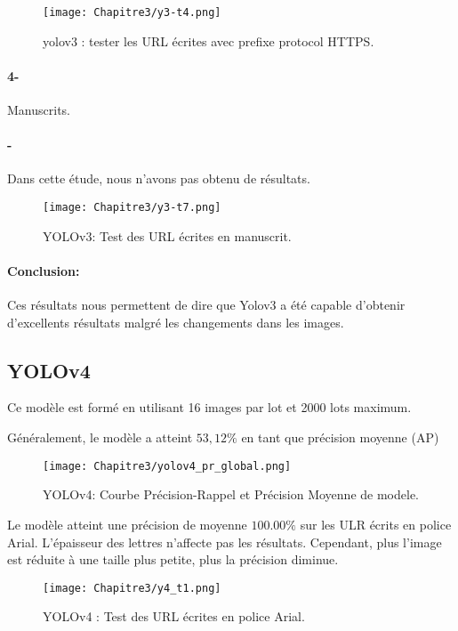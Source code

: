       \begin{figure}[H]
          \centering
           \texttt{[image: Chapitre3/y3-t4.png]}
           \caption{yolov3 : tester les URL écrites avec prefixe protocol HTTPS.}
           \label{y3_t4}
           \end{figure}


      \paragraph{4-} Manuscrits.
      \paragraph{-} Dans cette étude, nous n'avons pas obtenu de résultats.

      \begin{figure}[H]
          \centering
           \texttt{[image: Chapitre3/y3-t7.png]}
           \caption{YOLOv3: Test des URL écrites en manuscrit.}
           \label{y3_t7}
           \end{figure}

      \paragraph{Conclusion:} Ces résultats nous permettent de dire que Yolov3 a été capable d'obtenir d'excellents résultats malgré les changements dans les images.     

     \subsection{YOLOv4}
     Ce modèle est formé en utilisant 16 images par lot et 2000 lots maximum.

     Généralement, le modèle a atteint $53,12\%$ en tant que précision moyenne (AP)
     \begin{figure}[H]
               \centering
               \texttt{[image: Chapitre3/yolov4\_pr\_global.png]}
               \caption{YOLOv4: Courbe Précision-Rappel et Précision Moyenne de modele.}
               \label{y4_pr}
               \end{figure}
     
     Le modèle atteint une précision de moyenne $100.00\%$ sur les ULR écrits en police Arial. L'épaisseur des lettres n'affecte pas les résultats. Cependant, plus l'image est réduite à une taille plus petite, plus la précision diminue.
     \begin{figure}[H]
               \centering
               \texttt{[image: Chapitre3/y4\_t1.png]}
               \caption{YOLOv4 : Test des URL écrites en police Arial.}
               \label{y4_t1}
               \end{figure}
     
